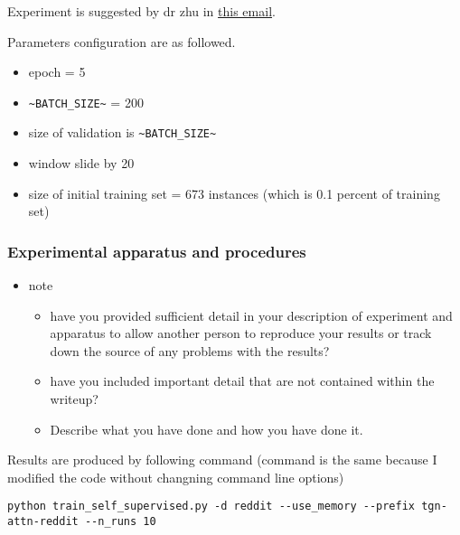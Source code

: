 \documentclass[11pt]{article}
\begin{document}
Experiment is suggested by dr zhu in \href{https://mail.google.com/mail/u/0/\#inbox/FFNDWMGfzXvrGrBQHKdkLqlnMMfJDTdM}{this email}.

Parameters configuration are as followed.

\begin{itemize}
\item epoch = 5
\item \texttt{\textasciitilde{}BATCH\_SIZE\textasciitilde{}} = 200
\item size of validation is \texttt{\textasciitilde{}BATCH\_SIZE\textasciitilde{}}
\item window slide by 20
\item size of initial training set = 673 instances (which is 0.1 percent of training set)
\end{itemize}
\subsubsection{Experimental apparatus and procedures}
\label{sec:orgc7ad34e}
\begin{itemize}
\item note
\begin{itemize}
\item have you provided sufficient detail in your description of experiment and apparatus to allow another person to reproduce your results or track down the source of any problems with the results?
\item have you included important detail that are not contained within the writeup?
\item Describe what you have done and how you have done it.
\end{itemize}
\end{itemize}

Results are produced by following command (command is the same because I modified the code without changning command line options)
\begin{verbatim}
python train_self_supervised.py -d reddit --use_memory --prefix tgn-attn-reddit --n_runs 10
\end{verbatim}
\end{document}
